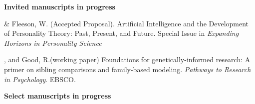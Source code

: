 {\large \textbf{Invited manuscripts in progress}}
\begin{etaremune}

\item \meb \& Fleeson, W. (Accepted Proposal). Artificial Intelligence and the Development of Personality Theory: Past, Present, and Future. Special Issue in \textit{Expanding Horizons in Personality Science}

\item \meb, and Good, R.\noteA (working paper) Foundations for genetically-informed research: A primer on sibling comparisons and family-based modeling. \textit{Pathways to Research in Psychology}. EBSCO.
\end{etaremune}
%



{\large \textbf{Select manuscripts in progress}}

